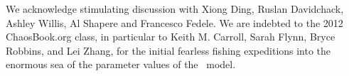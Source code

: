 \begin{acknowledgments}
We acknowledge stimulating discussion with
Xiong Ding,
Ruslan Davidchack,
Ashley Willis,
Al Shapere
and
Francesco Fedele.
We are indebted to the 2012 ChaosBook.org class, in particular to
Keith M. Carroll,
Sarah Flynn,
Bryce Robbins,
and
Lei Zhang,
for the initial fearless fishing expeditions into the enormous sea of the
parameter values of the \twomode\ model.
\end{acknowledgments}
